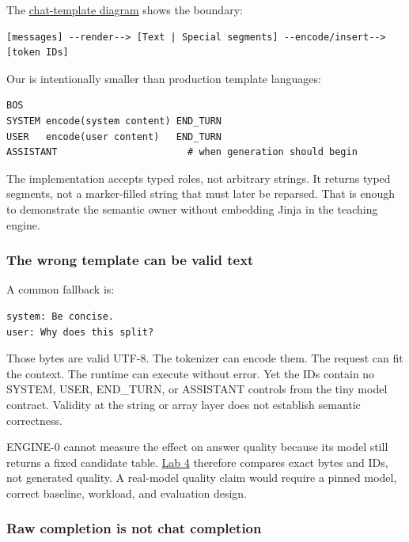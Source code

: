 \documentclass[
  10pt,
]{article}
\begin{document}
The
\href{https://github.com/hermonai/inside-the-llm-engine/blob/astra-visual-rewrite/diagrams/tokenizer/chat-template-pipeline.txt}{chat-template
diagram} shows the boundary:

\begin{verbatim}
[messages] --render--> [Text | Special segments] --encode/insert--> [token IDs]
\end{verbatim}

Our \texttt{} is intentionally smaller than
production template languages:

\begin{verbatim}
BOS
SYSTEM encode(system content) END_TURN
USER   encode(user content)   END_TURN
ASSISTANT                       # when generation should begin
\end{verbatim}

The implementation accepts typed roles, not arbitrary strings. It
returns typed segments, not a marker-filled string that must later be
reparsed. That is enough to demonstrate the semantic owner without
embedding Jinja in the teaching engine.

\subsubsection{The wrong template can be valid
text}\label{the-wrong-template-can-be-valid-text}

A common fallback is:

\begin{verbatim}
system: Be concise.
user: Why does this split?
\end{verbatim}

Those bytes are valid UTF-8. The tokenizer can encode them. The request
can fit the context. The runtime can execute without error. Yet the IDs
contain no SYSTEM, USER, END\_TURN, or ASSISTANT controls from the tiny
model contract. Validity at the string or array layer does not establish
semantic correctness.

ENGINE-0 cannot measure the effect on answer quality because its model
still returns a fixed candidate table.
\href{https://github.com/hermonai/inside-the-llm-engine/blob/astra-visual-rewrite/labs/lab-04-use-the-wrong-chat-template.md}{Lab
4} therefore compares exact bytes and IDs, not generated quality. A
real-model quality claim would require a pinned model, correct baseline,
workload, and evaluation design.

\subsubsection{Raw completion is not chat
completion}\label{raw-completion-is-not-chat-completion}
\end{document}
